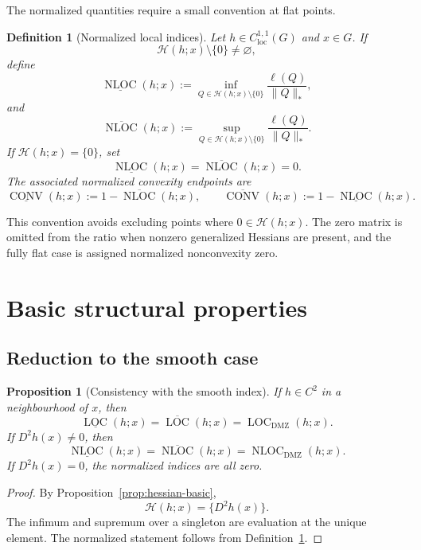 \documentclass[11pt]{article}
\numberwithin{equation}{section}
\newtheorem{proposition}[theorem]{Proposition}
\newtheorem{definition}[theorem]{Definition}
\newcommand{\Hess}{\mathcal H}
\newcommand{\LOC}{\operatorname{LOC}}
\newcommand{\NLOC}{\operatorname{NLOC}}
\newcommand{\CONV}{\operatorname{CONV}}
\begin{document}
	The normalized quantities require a small convention at flat points.
	
	\begin{definition}[Normalized local indices]
		\label{def:normalized}
		Let \(h\in C^{1,1}_{\mathrm{loc}}(G)\) and \(x\in G\). If
		\[
		\Hess(h;x)\setminus\{0\}\neq\varnothing,
		\]
		define
		\[
		\underline{\NLOC}(h;x)
		:=
		\inf_{Q\in\Hess(h;x)\setminus\{0\}}
		\frac{\ell(Q)}{\|Q\|_*},
		\]
		and
		\[
		\overline{\NLOC}(h;x)
		:=
		\sup_{Q\in\Hess(h;x)\setminus\{0\}}
		\frac{\ell(Q)}{\|Q\|_*}.
		\]
		If \(\Hess(h;x)=\{0\}\), set
		\[
		\underline{\NLOC}(h;x)
		=
		\overline{\NLOC}(h;x)
		=
		0.
		\]
		The associated normalized convexity endpoints are
		\[
		\underline{\CONV}(h;x)
		:=
		1-\overline{\NLOC}(h;x),
		\qquad
		\overline{\CONV}(h;x)
		:=
		1-\underline{\NLOC}(h;x).
		\]
	\end{definition}
	
	This convention avoids excluding points where \(0\in\Hess(h;x)\). The zero matrix is omitted from the ratio when nonzero generalized Hessians are present, and the fully flat case is assigned normalized nonconvexity zero.
	
	\section{Basic structural properties}
	
	\subsection{Reduction to the smooth case}
	
	\begin{proposition}[Consistency with the smooth index]
		\label{prop:smooth-reduction}
		If \(h\in C^2\) in a neighbourhood of \(x\), then
		\[
		\underline{\LOC}(h;x)
		=
		\overline{\LOC}(h;x)
		=
		\LOC_{\mathrm{DMZ}}(h;x).
		\]
		If \(D^2h(x)\neq0\), then
		\[
		\underline{\NLOC}(h;x)
		=
		\overline{\NLOC}(h;x)
		=
		\NLOC_{\mathrm{DMZ}}(h;x).
		\]
		If \(D^2h(x)=0\), the normalized indices are all zero.
	\end{proposition}
	
	\begin{proof}
		By Proposition~\ref{prop:hessian-basic},
		\[
		\Hess(h;x)=\{D^2h(x)\}.
		\]
		The infimum and supremum over a singleton are evaluation at the unique element. The normalized statement follows from Definition~\ref{def:normalized}.
	\end{proof}
	
\end{document}
